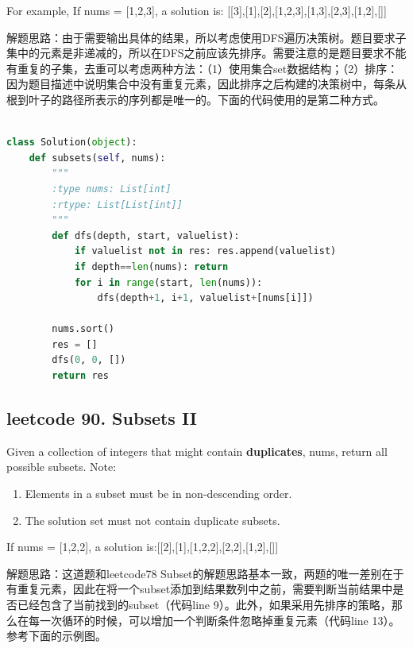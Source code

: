 \documentclass[a4paper,10pt]{article}
\begin{document}
\noindent For example, If nums = [1,2,3], a solution is: [[3],[1],[2],[1,2,3],[1,3],[2,3],[1,2],[]] \\

\begin{CJK*}{UTF8}{gbsn}
\noindent 解题思路：由于需要输出具体的结果，所以考虑使用DFS遍历决策树。题目要求子集中的元素是非递减的，所以在DFS之前应该先排序。需要注意的是题目要求不能有重复的子集，去重可以考虑两种方法：（1）使用集合set数据结构；（2）排序：因为题目描述中说明集合中没有重复元素，因此排序之后构建的决策树中，每条从根到叶子的路径所表示的序列都是唯一的。下面的代码使用的是第二种方式。\\
\end{CJK*}

\begin{lstlisting}[language=Python, caption=Problem78. Subsets]

class Solution(object):
    def subsets(self, nums):
        """
        :type nums: List[int]
        :rtype: List[List[int]]
        """
        def dfs(depth, start, valuelist):
            if valuelist not in res: res.append(valuelist)
            if depth==len(nums): return
            for i in range(start, len(nums)):
                dfs(depth+1, i+1, valuelist+[nums[i]])
        
        nums.sort()
        res = []
        dfs(0, 0, [])
        return res
\end{lstlisting}


\subsection{leetcode 90. Subsets II}
Given a collection of integers that might contain \textbf{duplicates}, nums, return all possible subsets. Note:
\begin{enumerate}
    \item Elements in a subset must be in non-descending order.
    \item The solution set must not contain duplicate subsets.
\end{enumerate}

\noindent If nums = [1,2,2], a solution is:[[2],[1],[1,2,2],[2,2],[1,2],[]] \\

\begin{CJK*}{UTF8}{gbsn}
\noindent 解题思路：这道题和leetcode78 Subset的解题思路基本一致，两题的唯一差别在于有重复元素，因此在将一个subset添加到结果数列中之前，需要判断当前结果中是否已经包含了当前找到的subset（代码line 9）。此外，如果采用先排序的策略，那么在每一次循环的时候，可以增加一个判断条件忽略掉重复元素（代码line 13）。参考下面的示例图。
\end{CJK*}
\end{document}
